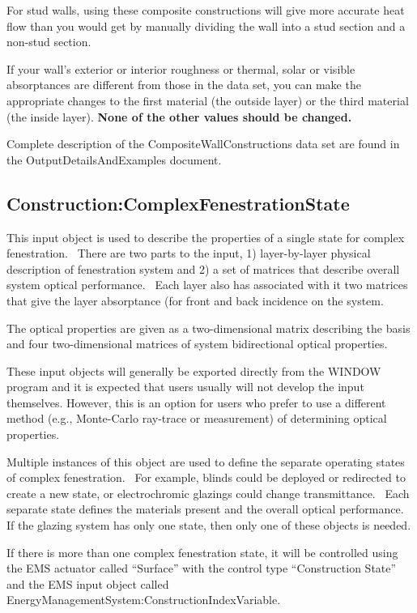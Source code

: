 For stud walls, using these composite constructions will give more accurate heat flow than you would get by manually dividing the wall into a stud section and a non-stud section.

If your wall's exterior or interior roughness or thermal, solar or visible absorptances are different from those in the data set, you can make the appropriate changes to the first material (the outside layer) or the third material (the inside layer). \textbf{None of the other values should be changed.}

\begin{callout}
Complete description of the CompositeWallConstructions data set are found in the OutputDetailsAndExamples document.
\end{callout}

\subsection{Construction:ComplexFenestrationState}\label{constructioncomplexfenestrationstate}

This input object is used to describe the properties of a single state for complex fenestration.~ There are two parts to the input, 1) layer-by-layer physical description of fenestration system and 2) a set of matrices that describe overall system optical performance.~ Each layer also has associated with it two matrices that give the layer absorptance (for front and back incidence on the system.

The optical properties are given as a two-dimensional matrix describing the basis and four two-dimensional matrices of system bidirectional optical properties.

These input objects will generally be exported directly from the WINDOW program and it is expected that users usually will not develop the input themselves. However, this is an option for users who prefer to use a different method (e.g., Monte-Carlo ray-trace or measurement) of determining optical properties.

Multiple instances of this object are used to define the separate operating states of complex fenestration.~ For example, blinds could be deployed or redirected to create a new state, or electrochromic glazings could change transmittance.~ Each separate state defines the materials present and the overall optical performance.~ If the glazing system has only one state, then only one of these objects is needed.

If there is more than one complex fenestration state, it will be controlled using the EMS actuator called ``Surface'' with the control type ``Construction State'' and the EMS input object called EnergyManagementSystem:ConstructionIndexVariable.

